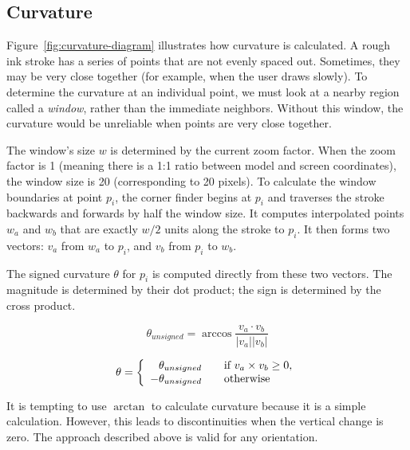 \subsection{Curvature}



Figure~\ref{fig:curvature-diagram} illustrates how curvature is
calculated. A rough ink stroke has a series of points that are not
evenly spaced out. Sometimes, they may be very close together (for
example, when the user draws slowly). To determine the curvature at an
individual point, we must look at a nearby region called a
\textit{window}, rather than the immediate neighbors. Without this
window, the curvature would be unreliable when points are very close
together.

The window's size $w$ is determined by the current zoom factor. When
the zoom factor is 1 (meaning there is a 1:1 ratio between model and
screen coordinates), the window size is 20 (corresponding to 20
pixels). To calculate the window boundaries at point $p_i$, the corner
finder begins at $p_i$ and traverses the stroke backwards and forwards
by half the window size. It computes interpolated points $w_a$ and
$w_b$ that are exactly $w/2$ units along the stroke to $p_i$. It then
forms two vectors: $v_a$ from $w_a$ to $p_i$, and $v_b$ from $p_i$ to
$w_b$.

The signed curvature $\theta$ for $p_i$ is computed directly from
these two vectors. The magnitude is determined by their dot product;
the sign is determined by the cross product.

\begin{samepage}
\begin{equation}
  \theta_{unsigned} = \arccos \frac{v_a\cdot v_b}{|v_a| |v_b|}
\end{equation}

\begin{equation}
  \theta = \left\{ 
  \begin{array}{r l}
    \theta_{unsigned} & \quad \text{if } v_a \times v_b \geq 0\text{,}\\
    -\theta_{unsigned} & \quad \text{otherwise}\\
  \end{array} \right .
\end{equation}
\end{samepage}

It is tempting to use $\arctan$ to calculate curvature because it is a
simple calculation. However, this leads to discontinuities when the
vertical change is zero. The approach described above is valid for any
orientation.

